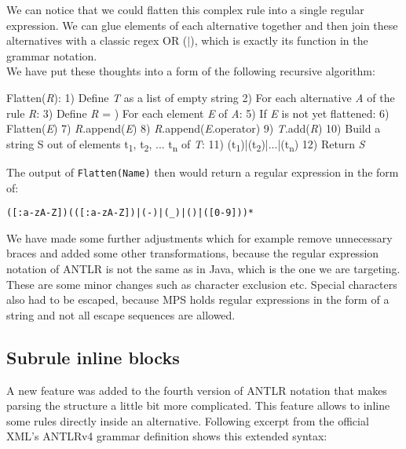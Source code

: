 We can notice that we could flatten this complex rule into a single regular expression. We can glue elements of each alternative together and then join these alternatives with a classic regex OR ($|$), which is exactly its function in the grammar notation.
\\

We have put these thoughts into a form of the following recursive algorithm:    

\begin{antlr}
Flatten(\textit{R}):
     1) Define \textit{T} as a list of empty string
     2) For each alternative \textit{A} of the rule \textit{R}:
     3)     Define \textit{R} = \ap{})     For each element \textit{E} of \textit{A}:
     5)         If \textit{E} is not yet flattened:
     6)             Flatten(\textit{E})
     7)         \textit{R}.append(\textit{E})
     8)         \textit{R}.append(\textit{E}.operator)
     9)     \textit{T}.add(\textit{R})
    10) Build a string S out of elements t\textsubscript{1}, t\textsubscript{2}, ... t\textsubscript{n} of \textit{T}:
    11)     (t\textsubscript{1})|(t\textsubscript{2})|...|(t\textsubscript{n})
    12) Return \textit{S}
\end{antlr}

The output of \texttt{Flatten(Name)} then would return a regular expression in the form of:

\begin{center}
	\texttt{([:a-zA-Z])(([:a-zA-Z])|(-)|({\_})|(\.)|([0-9]))*}
\end{center}

We have made some further adjustments which for example remove unnecessary braces and added some other transformations, because the regular expression notation of ANTLR is not the same as in Java, which is the one we are targeting. These are some minor changes such as character exclusion etc. Special characters also had to be escaped, because MPS holds regular expressions in the form of a string and not all escape sequences are allowed.

\subsection{Subrule inline blocks}

A new feature was added to the fourth version of ANTLR notation that makes parsing the structure a little bit more complicated. This feature allows to inline some rules directly inside an alternative. Following excerpt from the official XML's ANTLRv4 grammar definition shows this extended syntax:

